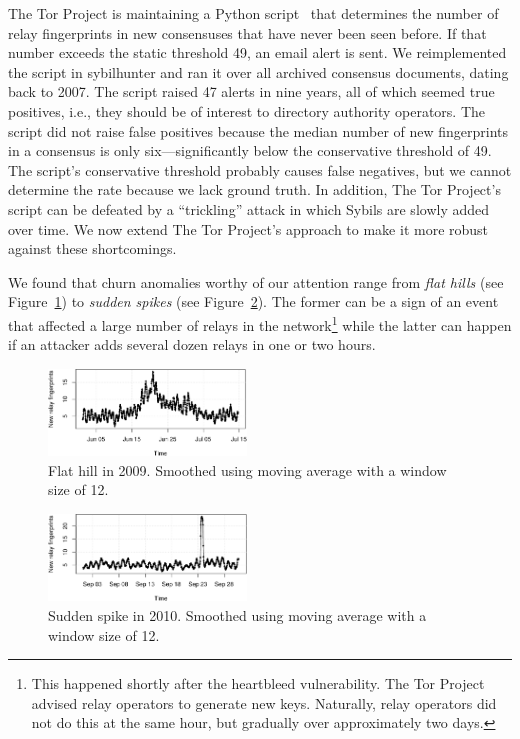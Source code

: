 The Tor Project is maintaining a Python script~\cite{doctor} that determines the
number of relay fingerprints in new consensuses that have never been seen
before.  If that number exceeds the static threshold 49, an email alert is sent.
We reimplemented the script in sybilhunter and ran it over all archived
consensus documents, dating back to 2007.  The script raised 47 alerts in nine
years, all of which seemed true positives, i.e., they should be of interest to
directory authority operators.  The script did not raise false positives because
the median number of new fingerprints in a consensus is only six---significantly
below the conservative threshold of 49.  The script's conservative threshold
probably causes false negatives, but we cannot determine the rate because we
lack ground truth.  In addition, The Tor Project's script can be defeated by a
``trickling'' attack in which Sybils are slowly added over time.  We now extend
The Tor Project's approach to make it more robust against these shortcomings.

We found that churn anomalies worthy of our attention range from \emph{flat
hills} (see Figure~\ref{fig:flat-hill}) to \emph{sudden spikes} (see
Figure~\ref{fig:sudden-spike}).  The former can be a sign of an event that
affected a large number of relays in the network\footnote{This happened shortly
after the heartbleed vulnerability.  The Tor Project advised relay operators
to generate new keys.  Naturally, relay operators did not do this at the same
hour, but gradually over approximately two days.} while the latter can happen if
an attacker adds several dozen relays in one or two hours.

\begin{figure}[t]
	\centering
	\includegraphics[width=0.47\textwidth]{diagrams/flat-hill.pdf}
	\caption{Flat hill in 2009.  Smoothed using moving average with a window
	size of 12.}
	\label{fig:flat-hill}
\end{figure}

\begin{figure}[t]
	\centering
	\includegraphics[width=0.47\textwidth]{diagrams/sudden-spike.pdf}
	\caption{Sudden spike in 2010.  Smoothed using moving average with a window
	size of 12.}
	\label{fig:sudden-spike}
\end{figure}

